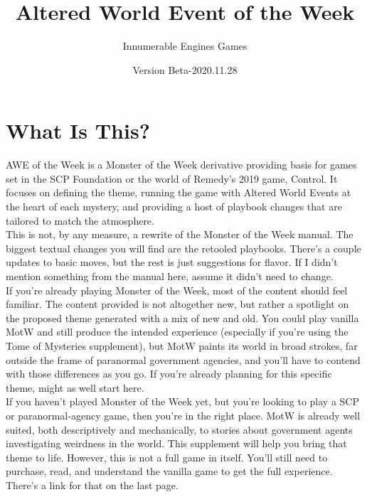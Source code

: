 \documentclass[10pt,oneside,landscape]{memoir}
\begin{document}
\title{Altered World Event of the Week}
\author{Innumerable Engines Games}
\date{Version Beta-2020.11.28}
\maketitle
\pagebreak

\fontsize{12}{14}\selectfont

\chapter*{What Is This?}
\begin{multicols}{2}

AWE of the Week is a Monster of the Week derivative providing basis for games set in the SCP Foundation or the world of Remedy’s 2019 game, Control.  It focuses on defining the theme, running the game with Altered World Events at the heart of each mystery, and providing a host of playbook changes that are tailored to match the atmosphere.
\\[4mm]
This is not, by any measure, a rewrite of the Monster of the Week manual.  The biggest textual changes you will find are the retooled playbooks.  There’s a couple updates to basic moves, but the rest is just suggestions for flavor.  If I didn’t mention something from the manual here, assume it didn’t need to change.
\\[4mm]
If you’re already playing Monster of the Week, most of the content should feel familiar.  The content provided is not altogether new, but rather a spotlight on the proposed theme generated with a mix of new and old.  You could play vanilla MotW and still produce the intended experience (especially if you’re using the Tome of Mysteries supplement), but MotW paints its world in broad strokes, far outside the frame of paranormal government agencies, and you’ll have to contend with those differences as you go.  If you’re already planning for this specific theme, might as well start here.
\\[4mm]
If you haven’t played Monster of the Week yet, but you’re looking to play a SCP or paranormal-agency game, then you’re in the right place.  MotW is already well suited, both descriptively and mechanically, to stories about government agents investigating weirdness in the world. This supplement will help you bring that theme to life.  However, this is not a full game in itself.  You’ll still need to purchase, read, and understand the vanilla game to get the full experience.  There’s a link for that on the last page.


\end{multicols}
\end{document}

